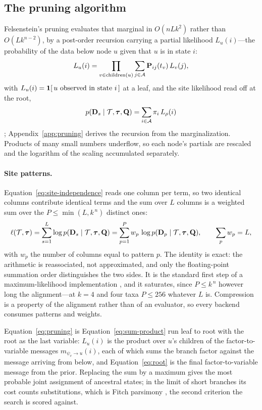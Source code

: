 \documentclass[11pt,a4paper]{article}
\begin{document}
\subsection{The pruning algorithm}
Felsenstein's pruning evaluates that marginal in $O(n L k^2)$ rather than
$O(L k^{n-2})$, by a post-order recursion carrying a partial likelihood
$L_u(i)$---the probability of the data below node $u$ given that $u$ is in
state $i$:
\begin{equation}
  L_u(i) = \prod_{v \in \mathrm{children}(u)}
           \sum_{j \in \mathcal{A}} \mathbf{P}_{ij}(t_v)\, L_v(j),
  \label{eq:pruning}
\end{equation}
with $L_u(i) = \mathbf{1}[\,\text{$u$ observed in state $i$}\,]$ at a leaf, and
the site likelihood read off at the root,
\begin{equation}
  p(\mathbf{D}_s \mid \mathcal{T}, \boldsymbol{\tau}, \mathbf{Q}) = \sum_{i \in \mathcal{A}} \pi_i\, L_{\rho}(i)
  \label{eq:root}
\end{equation}
\citep{felsenstein2004, durbin1998}; Appendix~\ref{app:pruning} derives the
recursion from the marginalization. Products of many small numbers underflow,
so each node's partials are rescaled and the logarithm of the scaling
accumulated separately.

\paragraph{Site patterns.}
Equation~\ref{eq:site-independence} reads one column per term, so two
identical columns contribute identical terms and the sum over $L$ columns is
a weighted sum over the $P \le \min(L, k^{\,n})$ distinct ones:
\begin{equation}
  \ell(\mathcal{T}, \boldsymbol{\tau})
    = \sum_{s=1}^{L} \log p(\mathbf{D}_s \mid \mathcal{T}, \boldsymbol{\tau}, \mathbf{Q})
    = \sum_{p=1}^{P} w_p \, \log p(\mathbf{D}_p \mid \mathcal{T}, \boldsymbol{\tau}, \mathbf{Q}),
  \qquad \sum_p w_p = L,
  \label{eq:site-patterns}
\end{equation}
with $w_p$ the number of columns equal to pattern $p$. The identity is exact:
the arithmetic is reassociated, not approximated, and only the floating-point
summation order distinguishes the two sides. It is the standard first step of a
maximum-likelihood implementation \citep{felsenstein2004}, and it saturates,
since $P \le k^{\,n}$ however long the alignment---at $k = 4$ and four taxa
$P \le 256$ whatever $L$ is. Compression is a property of the alignment rather
than of an evaluator, so every backend consumes patterns and weights.

Equation~\ref{eq:pruning} is Equation~\ref{eq:sum-product} run leaf to root
with the root as the last variable: $L_u(i)$ is the product over $u$'s
children of the factor-to-variable messages $m_{\psi_v \to u}(i)$, each of
which sums the branch factor against the message arriving from below, and
Equation~\ref{eq:root} is the final factor-to-variable message from the
prior. Replacing the sum by a maximum gives the most probable joint assignment
of ancestral states; in the limit of short branches its cost counts
substitutions, which is Fitch parsimony \citep{felsenstein2004}, the second
criterion the search is scored against.
\end{document}
